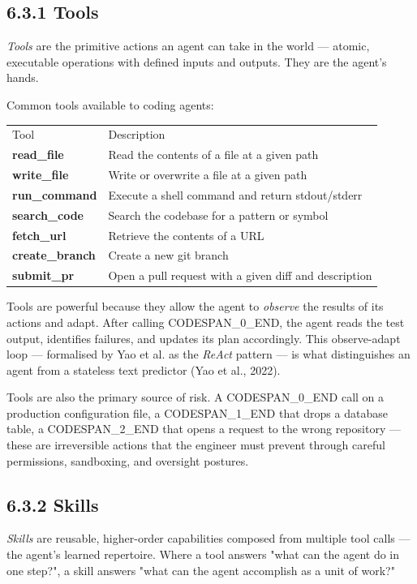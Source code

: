 \documentclass[11pt,a4paper]{book}
\begin{document}
\subsection{6.3.1 Tools}

\textit{Tools} are the primitive actions an agent can take in the world --- atomic, executable operations with defined inputs and outputs. They are the agent's hands.

Common tools available to coding agents:

\begin{tabular}{ll}
\hline
Tool & Description \\
\textbf{read\_file} & Read the contents of a file at a given path \\
\textbf{write\_file} & Write or overwrite a file at a given path \\
\textbf{run\_command} & Execute a shell command and return stdout/stderr \\
\textbf{search\_code} & Search the codebase for a pattern or symbol \\
\textbf{fetch\_url} & Retrieve the contents of a URL \\
\textbf{create\_branch} & Create a new git branch \\
\textbf{submit\_pr} & Open a pull request with a given diff and description \\
\hline
\end{tabular}

Tools are powerful because they allow the agent to \textit{observe} the results of its actions and adapt. After calling CODESPAN\_0\_END, the agent reads the test output, identifies failures, and updates its plan accordingly. This observe-adapt loop --- formalised by Yao et al. as the \textit{ReAct} pattern --- is what distinguishes an agent from a stateless text predictor (Yao et al., 2022).

Tools are also the primary source of risk. A CODESPAN\_0\_END call on a production configuration file, a CODESPAN\_1\_END that drops a database table, a CODESPAN\_2\_END that opens a request to the wrong repository --- these are irreversible actions that the engineer must prevent through careful permissions, sandboxing, and oversight postures.

\subsection{6.3.2 Skills}

\textit{Skills} are reusable, higher-order capabilities composed from multiple tool calls --- the agent's learned repertoire. Where a tool answers "what can the agent do in one step?", a skill answers "what can the agent accomplish as a unit of work?"
\end{document}
